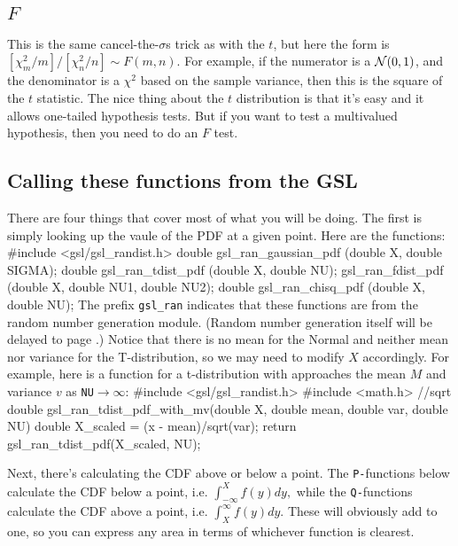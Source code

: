 \subsection{$F$}  This is the same cancel-the-$\sigma$s trick as with the $t$, but here the form
is $[\chi^2_m/m]/[\chi^2_n/n]\sim F(m,n)$. For example, if the numerator
is a ${\cal N}(0,1)$, and the denominator is a $\chi^2$ based on the
sample variance, then this is the square of the $t$ statistic.
The nice thing about the $t$ distribution is that it's easy and it
allows one-tailed hypothesis tests. But if you want to test a
multivalued hypothesis, then you need to do an $F$ test.

\subsection{Calling these functions from the GSL}
There are four things that cover most of what you will be doing. 
The first is simply looking up the vaule of the PDF at a given point. Here are the functions:
#include <gsl/gsl_randist.h>
double gsl_ran_gaussian_pdf (double X, double SIGMA);
double gsl_ran_tdist_pdf (double X, double NU);
gsl_ran_fdist_pdf (double X, double NU1, double NU2);
double gsl_ran_chisq_pdf (double X, double NU);
The prefix {\tt gsl\_ran} indicates that these functions are from the
random number generation module. (Random number generation itself will be delayed to page
\pageref{randomnumbers}.) Notice that there is no mean for the Normal and neither mean nor variance
for the T-distribution, so we may need to modify $X$ accordingly. For
example, here is a function for a t-distribution with approaches the
mean $M$ and variance $v$ as {\tt NU}$\to \infty$:
#include <gsl/gsl_randist.h>
#include <math.h>      //sqrt
double gsl_ran_tdist_pdf_with_mv(double X, double mean,
                               double var, double NU){
    double X_scaled = (x - mean)/sqrt(var);
    return gsl_ran_tdist_pdf(X_scaled, NU);
}

Next, there's calculating the CDF above or below a point. 
The {\tt P-}functions below calculate the CDF below a point, i.e.
$\int_{-\infty}^X f(y) dy,$
while the {\tt Q-}functions calculate the CDF above a point, i.e.
$\int^{\infty}_X f(y) dy.$
These will obviously add to one, so you can express any area in terms of whichever function is clearest.

